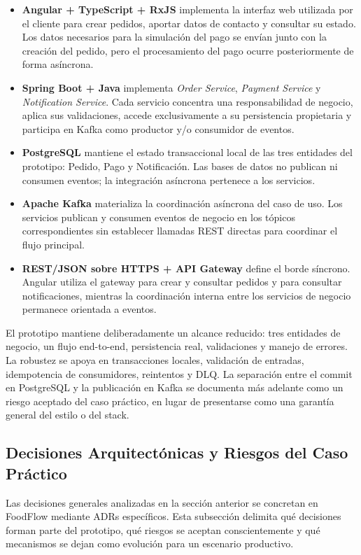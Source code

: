 \documentclass[12pt,a4paper]{article}
\begin{document}
\begin{itemize}[leftmargin=*]
    \item \textbf{Angular + TypeScript + RxJS} implementa la interfaz web utilizada por el cliente para crear pedidos, aportar datos de contacto y consultar su estado. Los datos necesarios para la simulación del pago se envían junto con la creación del pedido, pero el procesamiento del pago ocurre posteriormente de forma asíncrona.
    \item \textbf{Spring Boot + Java} implementa \textit{Order Service}, \textit{Payment Service} y \textit{Notification Service}. Cada servicio concentra una responsabilidad de negocio, aplica sus validaciones, accede exclusivamente a su persistencia propietaria y participa en Kafka como productor y/o consumidor de eventos.
    \item \textbf{PostgreSQL} mantiene el estado transaccional local de las tres entidades del prototipo: Pedido, Pago y Notificación. Las bases de datos no publican ni consumen eventos; la integración asíncrona pertenece a los servicios.
    \item \textbf{Apache Kafka} materializa la coordinación asíncrona del caso de uso. Los servicios publican y consumen eventos de negocio en los tópicos correspondientes sin establecer llamadas REST directas para coordinar el flujo principal.
    \item \textbf{REST/JSON sobre HTTPS + API Gateway} define el borde síncrono. Angular utiliza el gateway para crear y consultar pedidos y para consultar notificaciones, mientras la coordinación interna entre los servicios de negocio permanece orientada a eventos.
\end{itemize}

El prototipo mantiene deliberadamente un alcance reducido: tres entidades de negocio, un flujo end-to-end, persistencia real, validaciones y manejo de errores. La robustez se apoya en transacciones locales, validación de entradas, idempotencia de consumidores, reintentos y DLQ. La separación entre el commit en PostgreSQL y la publicación en Kafka se documenta más adelante como un riesgo aceptado del caso práctico, en lugar de presentarse como una garantía general del estilo o del stack.


\subsection{Decisiones Arquitectónicas y Riesgos del Caso Práctico}

Las decisiones generales analizadas en la sección anterior se concretan en FoodFlow mediante ADRs específicos. Esta subsección delimita qué decisiones forman parte del prototipo, qué riesgos se aceptan conscientemente y qué mecanismos se dejan como evolución para un escenario productivo.
\end{document}
